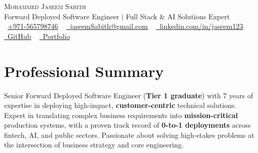 \documentclass[letterpaper,12pt]{article}
\begin{document}
\begin{center}
    {\Huge \scshape Mohammed Jaseem Sabith} \\ \vspace{2pt}
    \large Forward Deployed Software Engineer $|$ Full Stack \& AI Solutions Expert \\ \vspace{2pt}
    \small \raisebox{-0.1\height}\faPhone\ \href{tel:+971565798746}{+971-565798746} ~ \href{mailto:jaseemSabith@gmail.com}{\raisebox{-0.2\height}\faEnvelope\  \underline{jaseemSabith@gmail.com}} ~ 
    \href{https://www.linkedin.com/in/jaseem123/}{\raisebox{-0.2\height}\faLinkedin\ \underline{linkedin.com/in/jaseem123}} \\ \vspace{0pt}
    \href{https://github.com/Jaseem8}{\raisebox{-0.2\height}\faGithub\ \underline{GitHub}} ~
    \href{https://jaseem8.github.io/}{\raisebox{-0.2\height}\faGlobe\ \underline{Portfolio}}
    \vspace{-4pt}
\end{center}

\section{Professional Summary}
\vspace{-2pt}
\small{
    Senior Forward Deployed Software Engineer (\textbf{Tier 1 graduate}) with 7 years of expertise in deploying high-impact, \textbf{customer-centric} technical solutions. Expert in translating complex business requirements into \textbf{mission-critical} production systems, with a proven track record of \textbf{0-to-1 deployments} across fintech, AI, and public sectors. Passionate about solving high-stakes problems at the intersection of business strategy and core engineering.
}
\vspace{-6pt}

\end{document}
